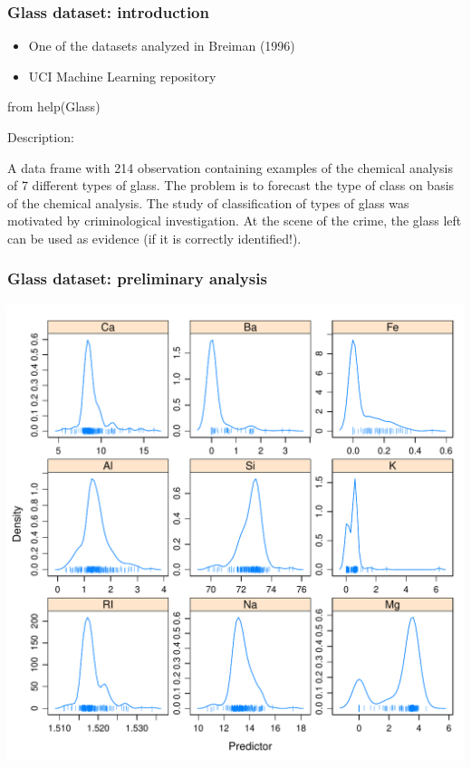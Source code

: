 \documentclass[bigger]{beamer}
\begin{document}
\begin{frame}
\frametitle{Glass dataset: introduction}
\label{sec-1-1-3}


\begin{itemize}
\item One of the datasets analyzed in Breiman (1996)
\item UCI Machine Learning repository
\end{itemize}


from help(Glass)

Description:

     A data frame with 214 observation containing examples of the
     chemical analysis of 7 different types of glass. The problem is to
     forecast the type of class on basis of the chemical analysis.  The
     study of classification of types of glass was motivated by
     criminological investigation.  At the scene of the crime, the
     glass left can be used as evidence (if it is correctly
     identified!).
\end{frame}
\begin{frame}
\frametitle{Glass dataset: preliminary analysis}
\label{sec-1-1-4}


\includegraphics[width=.9\linewidth]{./glassDensityPlots.pdf}
\end{frame}
\end{document}
